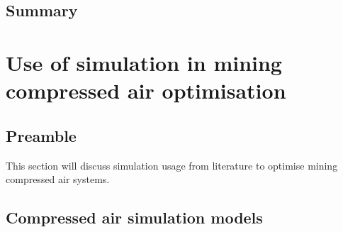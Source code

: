  	\subsection{Summary}
\clearpage	
\section{Use of simulation in mining compressed air optimisation}
\subsection{Preamble}
This section will discuss simulation usage from  literature to optimise mining compressed air systems.
\subsection{Compressed air simulation models} \label{simplfiedModels}
